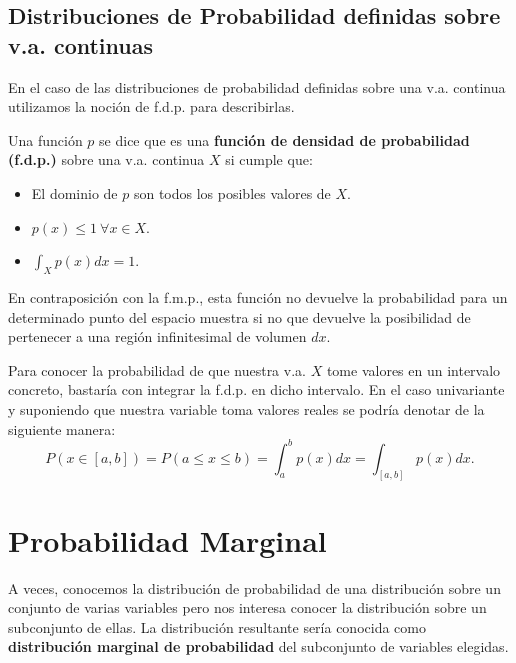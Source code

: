 \subsection{Distribuciones de Probabilidad definidas sobre \ac{v.a.} continuas}
En el caso de las distribuciones de probabilidad definidas sobre una \ac{v.a.} continua utilizamos la noción de \ac{f.d.p.} para describirlas.

\begin{definition}
    Una función $p$ se dice que es una \textbf{función de densidad de probabilidad (\ac{f.d.p.})} sobre una \ac{v.a.} continua $X$ si cumple que:
    \begin{itemize}
        \item El dominio de $p$ son todos los posibles valores de $X$.
        \item $p(x) \le 1\ \forall x \in X$.
        \item $\int_X p(x) dx = 1$.
    \end{itemize}
\end{definition}

En contraposición con la \ac{f.m.p.}, esta función no devuelve la probabilidad para un determinado punto del espacio muestra si no que devuelve la posibilidad de pertenecer a una región infinitesimal de volumen $dx$.

\begin{proposition}
    Para conocer la probabilidad de que nuestra \ac{v.a.} $X$ tome valores en un intervalo concreto, bastaría con integrar la \ac{f.d.p.} en dicho intervalo. En el caso univariante y suponiendo que nuestra variable toma valores reales se podría denotar de la siguiente manera:
    \begin{equation}
        P(x \in [a,b]) = P(a \le x \le b) = \int_a^bp(x)dx = \int_{[a,b]}p(x)dx.
    \end{equation}
\end{proposition}

\section{Probabilidad Marginal}
A veces, conocemos la distribución de probabilidad de una distribución sobre un conjunto de varias variables pero nos interesa conocer la distribución sobre un subconjunto de ellas. La distribución resultante sería conocida como \textbf{distribución marginal de probabilidad} del subconjunto de variables elegidas.


